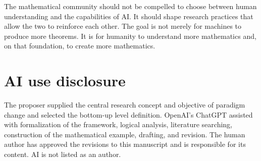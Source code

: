 \documentclass[11pt,a4paper]{article}
\theoremstyle{definition}\newtheorem{definition}{Definition}
\begin{document}
The mathematical community should not be compelled to choose between human understanding and the capabilities of AI. It should shape research practices that allow the two to reinforce each other. The goal is not merely for machines to produce more theorems. It is for humanity to understand more mathematics and, on that foundation, to create more mathematics.

\section*{AI use disclosure}
The proposer supplied the central research concept and objective of paradigm change and selected the bottom-up level definition. OpenAI's ChatGPT assisted with formalization of the framework, logical analysis, literature searching, construction of the mathematical example, drafting, and revision. The human author has approved the revisions to this manuscript and is responsible for its content. AI is not listed as an author.
\end{document}
